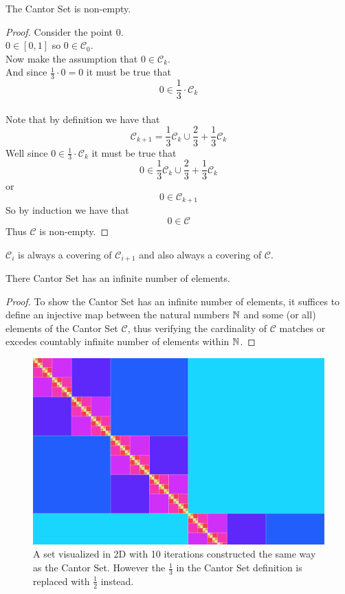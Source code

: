 \documentclass[11pt]{ekblite}
\begin{document}
	\begin{corollary}
		The Cantor Set is non-empty.
	\end{corollary}
	\begin{proof}Consider the point 0.
	\\[0.2in]$0 \in [0,1]$ so $0 \in \mathcal{C}_0$.
	\\[0.2in]Now make the assumption that $0 \in \mathcal{C}_k$.
	\\[0.2in]And since $\frac{1}{3} \cdot 0 = 0$ it must be true that
	\[0 \in \frac{1}{3} \cdot \mathcal{C}_k\] 
	\\[0.2in]Note that by definition we have that
	\[\mathcal{C}_{k+1} = \frac{1}{3} \mathcal{C}_{k} \cup \frac{2}{3} + \frac{1}{3} \mathcal{C}_{k}\]
	Well since $0 \in \frac{1}{3} \cdot \mathcal{C}_k$ it must be true that
	\[0 \in \frac{1}{3} \mathcal{C}_{k} \cup \frac{2}{3} + \frac{1}{3} \mathcal{C}_{k}\]
	or
	\[0 \in \mathcal{C}_{k+1}\]
	So by induction we have that
	\[0 \in \mathcal{C}\]
	Thus $\mathcal{C}$ is non-empty.
	\end{proof}
	\begin{corollary}
		$\mathcal{C}_{i}$ is always a covering of $\mathcal{C}_{i+1}$ and also always a covering of $\mathcal{C}$.
	\end{corollary}
	\begin{corollary}
		There Cantor Set has an infinite number of elements.
	\end{corollary}
	\begin{proof}
		To show the Cantor Set has an infinite number of elements, it suffices to define an injective map between the natural numbers $\mathbb{N}$ and some (or all) elements of the Cantor Set $\mathcal{C}$, thus verifying the cardinality of $\mathcal{C}$ matches or excedes countably infinite number of elements within $\mathbb{N}$.
	\end{proof}
	\newpage
	\begin{figure}[h]
		\includegraphics[scale=0.2]{img/c8.jpg}
		\caption{A set visualized in 2D with 10 iterations constructed the same way as the Cantor Set. However the $\frac{1}{3}$ in the Cantor Set definition is replaced with $\frac{1}{2}$ instead.}
	\end{figure}
\end{document}
